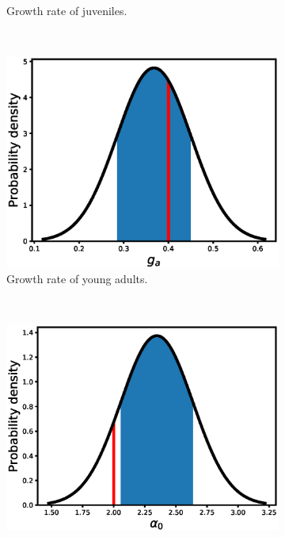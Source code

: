 \documentclass[12pt, table]{article}
\begin{document}
\begin{figure}[H]
\begin{subfigure}[b]{0.45\textwidth}
       \caption{Growth rate of  juveniles.}
       \label{fig2a}
   \end{subfigure}
   ~ %
   \begin{subfigure}[b]{0.45\textwidth}
       \includegraphics[width=1\textwidth, height=0.24\textheight]{figexple2/fgj}
        \caption{Growth rate of young adults.}
       \label{fig2b}
   \end{subfigure}\\
   \begin{subfigure}[b]{0.45\textwidth}
       \includegraphics[width=1\textwidth, height=0.24\textheight]{figexple2/falpha0}
      

\end{subfigure}
\end{figure}
\end{document}
